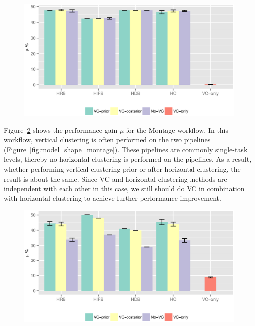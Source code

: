 \begin{figure}[!htb]
	\centering
	\includegraphics[width=0.8\linewidth]{figures/balance/figure24.eps}
	\label{fig:evaluation_vc_cybershake}
\end{figure}

Figure~\ref{fig:evaluation_vc_montage} shows the performance gain $\mu$ for the Montage workflow. In this workflow, vertical clustering is often performed on the two pipelines (Figure~\ref{fig:model_shape_montage}). These pipelines are commonly single-task levels, thereby no horizontal clustering is performed on the pipelines. As a result, whether performing vertical clustering prior or after horizontal clustering, the result is about the same. Since VC and horizontal clustering methods are independent with each other in this case, we still should do VC in combination with horizontal clustering to achieve further performance improvement. 

\begin{figure}[!htb]
	\centering
	\includegraphics[width=0.8\linewidth]{figures/balance/figure25.eps}
	\label{fig:evaluation_vc_montage}
\end{figure}


